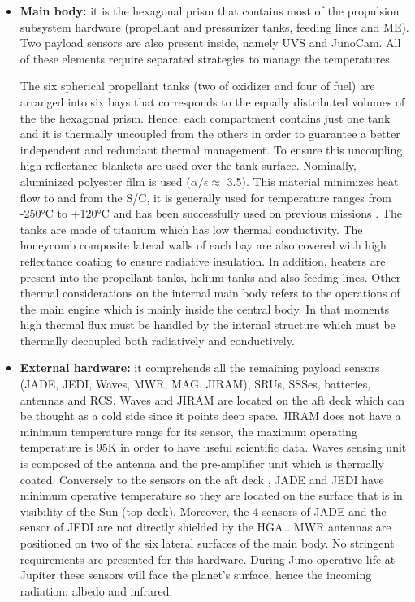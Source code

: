\begin{itemize}
    \item \textbf{Main body:} it is the hexagonal prism that contains most of the propulsion subsystem hardware (propellant and pressurizer tanks, feeding lines and ME). Two payload sensors are also present inside, namely UVS and JunoCam. All of these elements require separated strategies to manage the temperatures. 
    
    The six spherical propellant tanks (two of oxidizer and four of fuel) are arranged into six bays that corresponds to the equally distributed volumes of the the hexagonal prism. Hence, each compartment contains just one tank and it is thermally uncoupled from the others in order to guarantee a better independent and redundant thermal management. To ensure this uncoupling, high reflectance blankets are used over the tank surface. Nominally, aluminized polyester film is used ($\alpha / \epsilon \approx$ 3.5). This material minimizes heat flow to and from the S/C, it is generally used for temperature ranges from -250°C to +120°C and has been successfully used on previous missions \cite{alum_poly}. The tanks are made of titanium which has low thermal conductivity. 
    The honeycomb composite lateral walls of each bay are also covered with high reflectance coating to ensure radiative insulation.
    In addition, heaters are present into the propellant tanks, helium tanks and also feeding lines. \cite{LL_early_cruise}
    Other thermal considerations on the internal main body refers to the  operations of the main engine which is mainly inside the central body. In that moments high thermal flux must be handled by the internal structure which must be thermally decoupled both radiatively and conductively. %
    \item \textbf{External hardware:} it comprehends all the remaining payload sensors (JADE, JEDI, Waves, MWR, MAG, JIRAM), SRUs, SSSes, batteries, antennas and RCS. Waves and JIRAM are located on the aft deck which can be thought as a cold side since it points deep space. JIRAM does not have a minimum temperature range for its sensor, the maximum operating temperature is 95K in order to have useful scientific data.\cite{JIRAM_info} Waves sensing unit is composed of the antenna and the pre-amplifier unit which is thermally coated. Conversely to the sensors on the aft deck \cite{Waves_info}, JADE and JEDI have minimum operative temperature so they are located on the surface that is in visibility of the Sun (top deck). Moreover, the 4 sensors of JADE and the sensor of JEDI are not directly shielded by the HGA \cite{JADE_info}.\cite{JEDI_info} MWR antennas are positioned on two of the six lateral surfaces of the main body. \cite{MWR_info} No stringent requirements are presented for this hardware. During Juno operative life at Jupiter these sensors will face the planet's surface, hence the incoming radiation: albedo and infrared. 

\end{itemize}

